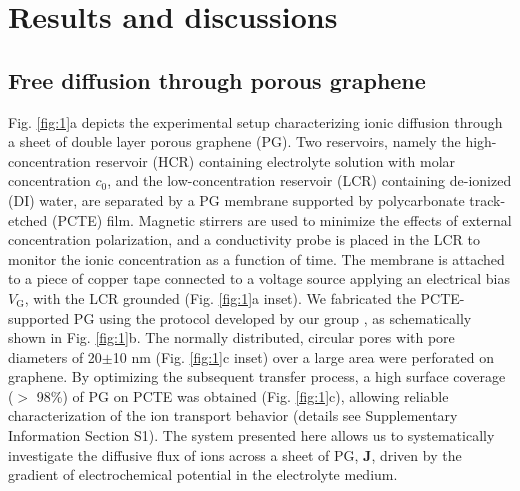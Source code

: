 \documentclass[journal=langd5,email=true, hyperref=true, keywords=false]{achemso}
\newcommand{\Fig}{Fig.}
\begin{document}
\section{Results and discussions}
\label{sec:res}

\subsection{Free diffusion through porous graphene}
\label{sec:res-1}

\Fig{} \ref{fig:1}a depicts the experimental setup characterizing
ionic diffusion through a sheet of double layer porous graphene
(PG). Two reservoirs, namely the high-concentration reservoir (HCR)
containing electrolyte solution with molar concentration $c_0$, and
the low-concentration reservoir (LCR) containing de-ionized (DI)
water, are separated by a PG membrane supported by polycarbonate
track-etched (PCTE) film. Magnetic stirrers are used to minimize the
effects of external concentration polarization, and a conductivity
probe is placed in the LCR to monitor the ionic concentration as a
function of time. The membrane is attached to a piece of copper tape
connected to a voltage source applying an electrical bias
$V_{\mathrm{G}}$, with the LCR grounded (\Fig{} \ref{fig:1}a
inset). We fabricated the PCTE-supported PG using the protocol
developed by our group \cite{Choi_2018}, as schematically shown in
\Fig{} \ref{fig:1}b. The normally distributed, circular pores with
pore diameters of 20$\pm$10 nm (\Fig{} \ref{fig:1}c inset) over a
large area were perforated on graphene.  By optimizing the subsequent
transfer process, a high surface coverage ($>$ 98\%) of PG on PCTE was
obtained (\Fig{} \ref{fig:1}c), allowing reliable characterization of
the ion transport behavior (details see Supplementary Information
Section S1).  The system presented here allows us to systematically
investigate the diffusive flux of ions across a sheet of PG,
$\boldsymbol{J}$, driven by the gradient of electrochemical potential
in the electrolyte medium.
\end{document}
